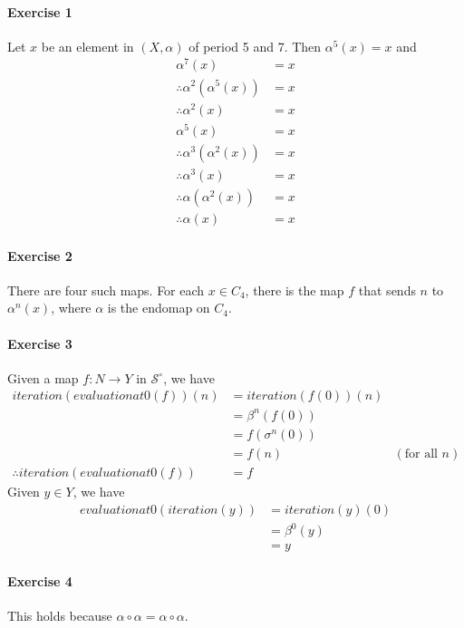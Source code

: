 \documentclass{report}
\begin{document}
    \paragraph{Exercise 1}
    Let $x$ be an element in $(X, \alpha)$ of period 5 and 7. Then $\alpha^5(x) = x$ and
    \begin{align*}
        \alpha^7(x) & = x \\
        \therefore \alpha^2(\alpha^5(x)) & = x \\
        \therefore \alpha^2(x) & = x \\
        \alpha^5(x) & = x \\
        \therefore \alpha^3(\alpha^2(x)) & = x \\
        \therefore \alpha^3(x) & = x \\
        \therefore \alpha(\alpha^2(x)) & = x \\
        \therefore \alpha(x) & = x
    \end{align*}

    \paragraph{Exercise 2}
    There are four such maps. For each $x \in C_4$, there is the map $f$ that sends $n$ to $\alpha^n(x)$,
    where $\alpha$ is the endomap on $C_4$.

    \paragraph{Exercise 3}
    Given a map $f : N \rightarrow Y$ in $\mathcal{S}^\circ$, we have
    \begin{align*}
        iteration(evaluation at 0(f))(n) & = iteration(f(0))(n) \\
        & = \beta^{n}(f(0)) \\
        & = f(\sigma^n(0)) \\
        & = f(n) & (\text{for all $n$})\\
        \therefore iteration(evaluation at 0(f)) & = f
    \end{align*}
    Given $y \in Y$, we have
    \begin{align*}
        evaluation at 0(iteration(y)) & = iteration(y)(0) \\
        & = \beta^0(y) \\
        & = y
    \end{align*}

    \paragraph{Exercise 4}
    This holds because $\alpha \circ \alpha = \alpha \circ \alpha$.
\end{document}

